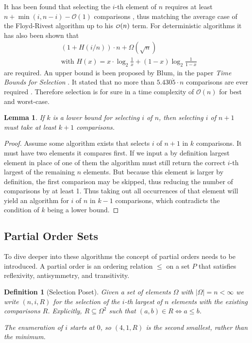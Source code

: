 \documentclass[10pt,journal,compsoc]{IEEEtran}
\newcommand\smallO{
  \mathchoice
    {{\scriptstyle\mathcal{O}}}%
    {{\scriptstyle\mathcal{O}}}%
    {{\scriptscriptstyle\mathcal{O}}}%
    {\scalebox{.50}{$\scriptscriptstyle\mathcal{O}$}}%
  }
\newtheorem{lemma}{Lemma}
\newtheorem{definition}{Definition}
\begin{document}
It has been found that selecting the $i$-th element of $n$ requires at least
$n+\min(i,n-i)-\mathcal{O}(1)$ comparisons , thus matching the average case of the Floyd-Rivest
algorithm up to his $\smallO(n)$ term. For deterministic algorithms it has also been shown that
\begin{eqnarray*}
  &\left (1 + H(i/n) \right ) \cdot n + \Omega(\sqrt n) \\
  &\text{with~} H(x) = x \cdot \log_2 \frac{1}{x} + (1-x) \log_2 \frac{1}{1-x}
\end{eqnarray*}
are required. An upper bound is been proposed by Blum, in the paper \textit{Time Bounds for
  Selection} \cite{Blum1972}. It stated that no more than $5.430\dot{5} \cdot n$ comparisons are ever required .
Therefore selection is for sure in a time complexity of $\mathcal{O}(n)$ for best and worst-case.

\begin{lemma}
  If $k$ is a lower bound for selecting $i$ of $n$, then selecting $i$ of $n+1$ must take at least $k+1$ comparisons.
\end{lemma}
\begin{proof}
  Assume some algorithm exists that selects $i$ of $n+1$ in $k$ comparisons. It must have two elements it compares first.
  If we input a by definition largest element in place of one of them the algorithm must still return the correct $i$-th
  largest of the remaining $n$ elements. But because this element is larger by definition, the first comparison may be
  skipped, thus reducing the number of comparisons by at least 1. Thus taking out all occurrences of that element will
  yield an algorithm for $i$ of $n$ in $k-1$ comparisons, which contradicts the condition of $k$ being a lower bound.
\end{proof}

\subsection{Partial Order Sets}
To dive deeper into these algorithms the concept of partial orders needs to be introduced. A partial
order is an ordering relation
$\leq$ on a set $P$ that satisfies reflexivity, antisymmetry, and transitivity.

\begin{definition}[Selection Poset]
  Given a set of elements $\Omega$ with $|\Omega| = n < \infty$ we write
  $(n, i, R)$ for the selection of the $i$-th largest of $n$ elements
  with the existing comparisons $R$.
  Explicitly, $R\subseteq\Omega^2$ such that $(a, b)\in R \Longleftrightarrow a \leq b$.

  The enumeration of $i$ starts at $0$, so $(4, 1, R)$ is the second smallest,
  rather than the minimum.
\end{definition}
\end{document}
